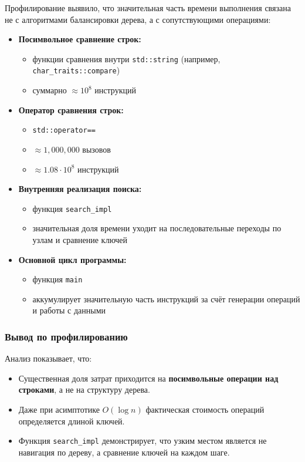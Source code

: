 Профилирование выявило, что значительная часть времени выполнения связана не с алгоритмами балансировки дерева, а с сопутствующими операциями:

\begin{itemize}
    \item \textbf{Посимвольное сравнение строк:}
    \begin{itemize}
        \item функции сравнения внутри \texttt{std::string} 
        (например, \texttt{char\_traits::compare})
        \item суммарно $\approx 10^8$ инструкций
    \end{itemize}

    \item \textbf{Оператор сравнения строк:}
    \begin{itemize}
        \item \texttt{std::operator==}
        \item $\approx 1{,}000{,}000$ вызовов
        \item $\approx 1.08 \cdot 10^8$ инструкций
    \end{itemize}

    \item \textbf{Внутренняя реализация поиска:}
    \begin{itemize}
        \item функция \texttt{search\_impl}
        \item значительная доля времени уходит на последовательные переходы по узлам и сравнение ключей
    \end{itemize}

    \item \textbf{Основной цикл программы:}
    \begin{itemize}
        \item функция \texttt{main}
        \item аккумулирует значительную часть инструкций за счёт генерации операций и работы с данными
    \end{itemize}
\end{itemize}

\subsubsection*{Вывод по профилированию}

Анализ показывает, что:

\begin{itemize}
    \item Существенная доля затрат приходится на \textbf{посимвольные операции над строками}, а не на структуру дерева.
    \item Даже при асимптотике $O(\log n)$ фактическая стоимость операций определяется длиной ключей.
    \item Функция \texttt{search\_impl} демонстрирует, что узким местом является не навигация по дереву, а сравнение ключей на каждом шаге.
\end{itemize}

